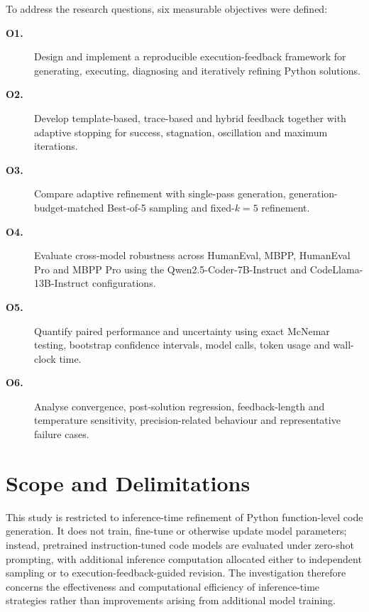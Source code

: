 To address the research questions, six measurable objectives were defined:

\begin{description}

\item[\textbf{O1.}] Design and implement a reproducible execution-feedback framework for generating, executing, diagnosing and iteratively refining Python solutions.

\item[\textbf{O2.}] Develop template-based, trace-based and hybrid feedback together with adaptive stopping for success, stagnation, oscillation and maximum iterations.

\item[\textbf{O3.}] Compare adaptive refinement with single-pass generation, generation-budget-matched Best-of-5 sampling and fixed-$k=5$ refinement.

\item[\textbf{O4.}] Evaluate cross-model robustness across HumanEval, MBPP, HumanEval Pro and MBPP Pro using the Qwen2.5-Coder-7B-Instruct and CodeLlama-13B-Instruct configurations.

\item[\textbf{O5.}] Quantify paired performance and uncertainty using exact McNemar testing, bootstrap confidence intervals, model calls, token usage and wall-clock time.

\item[\textbf{O6.}] Analyse convergence, post-solution regression, feedback-length and temperature sensitivity, precision-related behaviour and representative failure cases.

\end{description}

\section{Scope and Delimitations}

This study is restricted to inference-time refinement of Python function-level code generation. It does not train, fine-tune or otherwise update model parameters; instead, pretrained instruction-tuned code models are evaluated under zero-shot prompting, with additional inference computation allocated either to independent sampling or to execution-feedback-guided revision. The investigation therefore concerns the effectiveness and computational efficiency of inference-time strategies rather than improvements arising from additional model training.

